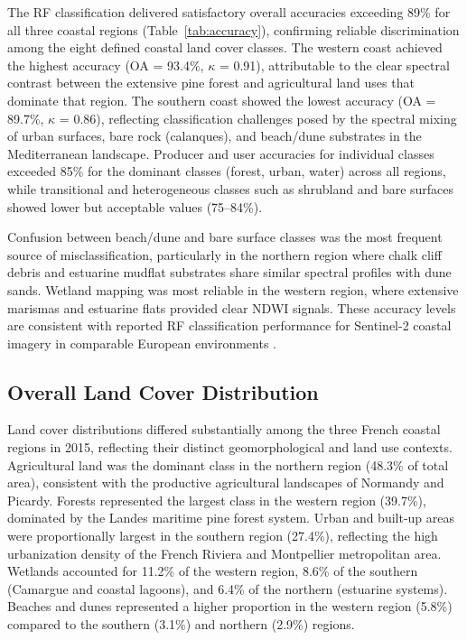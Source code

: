 \documentclass[remotesensing,article,submit,pdftex,moreauthors]{Definitions/mdpi}
\begin{document}
The RF classification delivered satisfactory overall accuracies exceeding 89\% for all three coastal regions (Table~\ref{tab:accuracy}), confirming reliable discrimination among the eight defined coastal land cover classes. The western coast achieved the highest accuracy (OA = 93.4\%, $\kappa$ = 0.91), attributable to the clear spectral contrast between the extensive pine forest and agricultural land uses that dominate that region. The southern coast showed the lowest accuracy (OA = 89.7\%, $\kappa$ = 0.86), reflecting classification challenges posed by the spectral mixing of urban surfaces, bare rock (calanques), and beach/dune substrates in the Mediterranean landscape. Producer and user accuracies for individual classes exceeded 85\% for the dominant classes (forest, urban, water) across all regions, while transitional and heterogeneous classes such as shrubland and bare surfaces showed lower but acceptable values (75--84\%).

Confusion between beach/dune and bare surface classes was the most frequent source of misclassification, particularly in the northern region where chalk cliff debris and estuarine mudflat substrates share similar spectral profiles with dune sands. Wetland mapping was most reliable in the western region, where extensive marismas and estuarine flats provided clear NDWI signals. These accuracy levels are consistent with reported RF classification performance for Sentinel-2 coastal imagery in comparable European environments \citep{RF_Czechia2022, VegPortugal2022}.

\subsection{Overall Land Cover Distribution}

Land cover distributions differed substantially among the three French coastal regions in 2015, reflecting their distinct geomorphological and land use contexts. Agricultural land was the dominant class in the northern region (48.3\% of total area), consistent with the productive agricultural landscapes of Normandy and Picardy. Forests represented the largest class in the western region (39.7\%), dominated by the Landes maritime pine forest system. Urban and built-up areas were proportionally largest in the southern region (27.4\%), reflecting the high urbanization density of the French Riviera and Montpellier metropolitan area. Wetlands accounted for 11.2\% of the western region, 8.6\% of the southern (Camargue and coastal lagoons), and 6.4\% of the northern (estuarine systems). Beaches and dunes represented a higher proportion in the western region (5.8\%) compared to the southern (3.1\%) and northern (2.9\%) regions.
\end{document}
